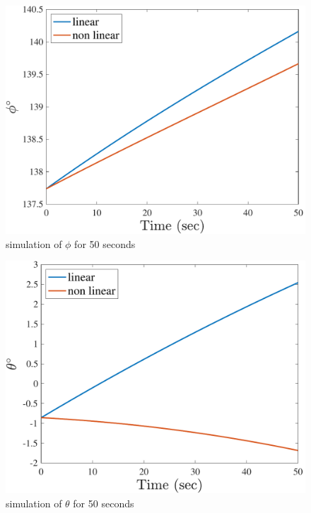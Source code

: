 \begin{figure}[H]
    \caption{simulation of $\phi$ for 50 seconds}
    \centering
    \includegraphics[width=12cm]{../Figure/Q2/phi_50}
\end{figure}

\begin{figure}[H]
    \caption{simulation of $\theta$ for 50 seconds}
    \centering
    \includegraphics[width=12cm]{../Figure/Q2/theta_50}
\end{figure}

